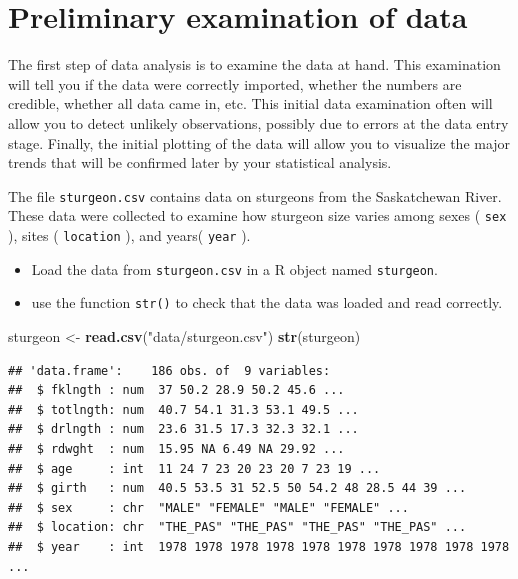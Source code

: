 \documentclass[
  12pt,
]{book}
\newenvironment{Shaded}{\begin{snugshade}}{\end{snugshade}}
\newcommand{\KeywordTok}[1]{\textcolor[rgb]{0.13,0.29,0.53}{\textbf{#1}}}
\newcommand{\NormalTok}[1]{#1}
\newcommand{\StringTok}[1]{\textcolor[rgb]{0.31,0.60,0.02}{#1}}
\providecommand{\tightlist}{%
  \setlength{\itemsep}{0pt}\setlength{\parskip}{0pt}}
\begin{document}
\hypertarget{preliminary-examination-of-data}{%
\section{Preliminary examination of data}\label{preliminary-examination-of-data}}

The first step of data analysis is to examine the data at hand. This examination will tell you if the data were correctly imported, whether the numbers are credible, whether all data came in, etc. This initial data examination often will allow you to detect unlikely observations, possibly due to errors at the data entry stage. Finally, the initial plotting of the data will allow you to visualize the major trends that will be confirmed later by your statistical analysis.

The file \texttt{sturgeon.csv} contains data on sturgeons from the Saskatchewan River. These data were collected to examine how sturgeon size varies among sexes ( \texttt{sex} ), sites ( \texttt{location} ), and years( \texttt{year} ).

\begin{itemize}
\tightlist
\item
  Load the data from \texttt{sturgeon.csv} in a R object named \texttt{sturgeon}.
\item
  use the function \texttt{str()} to check that the data was loaded and read correctly.
\end{itemize}

\begin{Shaded}
\begin{Highlighting}[]
\NormalTok{sturgeon \textless{}{-}}\StringTok{ }\KeywordTok{read.csv}\NormalTok{(}\StringTok{"data/sturgeon.csv"}\NormalTok{)}
\KeywordTok{str}\NormalTok{(sturgeon)}
\end{Highlighting}
\end{Shaded}

\begin{verbatim}
## 'data.frame':    186 obs. of  9 variables:
##  $ fklngth : num  37 50.2 28.9 50.2 45.6 ...
##  $ totlngth: num  40.7 54.1 31.3 53.1 49.5 ...
##  $ drlngth : num  23.6 31.5 17.3 32.3 32.1 ...
##  $ rdwght  : num  15.95 NA 6.49 NA 29.92 ...
##  $ age     : int  11 24 7 23 20 23 20 7 23 19 ...
##  $ girth   : num  40.5 53.5 31 52.5 50 54.2 48 28.5 44 39 ...
##  $ sex     : chr  "MALE" "FEMALE" "MALE" "FEMALE" ...
##  $ location: chr  "THE_PAS" "THE_PAS" "THE_PAS" "THE_PAS" ...
##  $ year    : int  1978 1978 1978 1978 1978 1978 1978 1978 1978 1978 ...
\end{verbatim}
\end{document}
